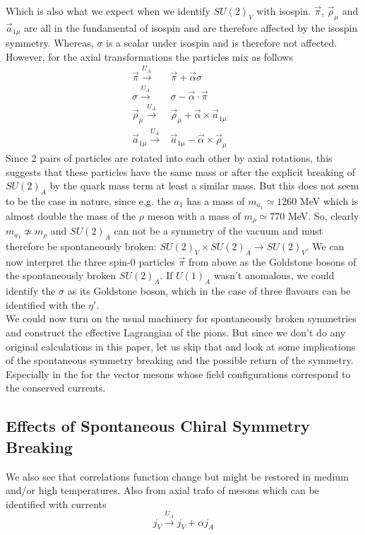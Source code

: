 Which is also what we expect when we identify $SU(2)_V$ with isospin. $\vec{\pi}$, $\vec{\rho}_{\mu}$ and $\vec{a}_{1 \mu}$ are all in the fundamental of isospin and are therefore affected by the isospin symmetry. Whereas, $\sigma$ is a scalar under isospin and is therefore not affected. \\
However, for the axial transformations the particles mix as follows
\begin{align}
\vec{\pi} \overset{U_A}{\longrightarrow} & \vec{\pi} + \vec{\alpha} \sigma & \\
\sigma \overset{U_A}{\longrightarrow} & \sigma - \vec{\alpha} \cdot \vec{\pi} & \\
\vec{\rho}_{\mu} \overset{U_A}{\longrightarrow} & \vec{\rho}_{\mu} + \vec{\alpha} \times \vec{a}_{1 \mu} & \\
\vec{a}_{1 \mu} \overset{U_A}{\longrightarrow} & \vec{a}_{1 \mu} - \vec{\alpha} \times \vec{\rho}_{\mu}
\end{align}
Since 2 pairs of particles are rotated into each other by axial rotations, this suggests that these particles have the same mass or after the explicit breaking of $SU(2)_A$ by the quark mass term at least a similar mass. But this does not seem to be the case in nature, since e.g. the $a_1$ has a mass of $m_{a_1} \simeq 1260$ MeV which is almost double the mass of the $\rho$ meson with a mass of $m_{\rho} \simeq 770$ MeV. 
So, clearly $m_{a_1} \not\simeq m_{\rho}$ and $SU(2)_A$ can not be a symmetry of the vacuum and must therefore be spontaneously broken: $SU(2)_V \times SU(2)_A \rightarrow SU(2)_V$. We can now interpret the three spin-0 particles $\vec{\pi}$ from above as the Goldstone bosons of the spontaneously broken $SU(2)_A$. If $U(1)_A$ wasn't anomalous, we could identify the $\sigma$ as its Goldstone boson, which in the case of three flavours can be identified with the $\eta'$. \\
We could now turn on the usual machinery for spontaneously broken symmetries and construct the effective Lagrangian of the pions. But since we don't do any original calculations in this paper, let us skip that and look at some implications of the spontaneous symmetry breaking and the possible return of the symmetry. Especially in the for the vector mesons whose field configurations correspond to the conserved currents.

\subsection{Effects of Spontaneous Chiral Symmetry Breaking}

We also see that \cite{ChiPart} correlations function change but might be restored in medium and/or high temperatures. Also from axial trafo of mesons which can be identified with currents
\begin{equation}
j_V \overset{U_A}{\longrightarrow} j_V + \alpha j_A
\end{equation}


